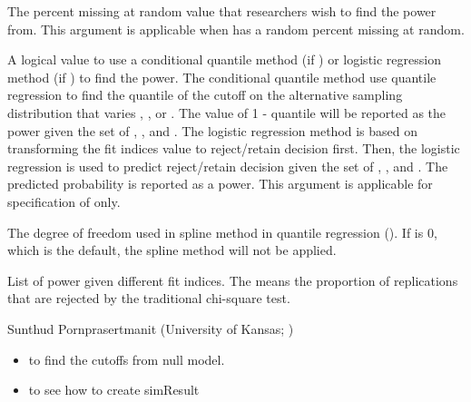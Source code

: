 \documentclass[a4paper]{book}
\begin{document}
\begin{Arguments}
\begin{ldescription}
\item[\code{pmMARval}] 
The percent missing at random value that researchers wish to find the power from. This argument is applicable when  has a random percent missing at random. 

\item[\code{condCutoff}] 
A logical value to use a conditional quantile method (if ) or logistic regression method (if ) to find the power. The conditional quantile method use quantile regression to find the quantile of the cutoff on the alternative sampling distribution that varies , , or . The value of 1 - quantile will be reported as the power given the set of , , and . The logistic regression method is based on transforming the fit indices value to reject/retain decision first. Then, the logistic regression is used to predict reject/retain decision given the set of , , and . The predicted probability is reported as a power. This argument is applicable for specification of  only.

\item[\code{df}] 
The degree of freedom used in spline method in quantile regression (). If  is 0, which is the default, the spline method will not be applied.

\end{ldescription}
\end{Arguments}
%
\begin{Value}
List of power given different fit indices. The  means the proportion of replications that are rejected by the traditional chi-square test.
\end{Value}
%
\begin{Author}\relax
Sunthud Pornprasertmanit (University of Kansas; )
\end{Author}
%
\begin{SeeAlso}\relax
\begin{itemize}

\item {} to find the cutoffs from null model.
\item {} to see how to create simResult

\end{itemize}

\end{SeeAlso}
\end{document}
